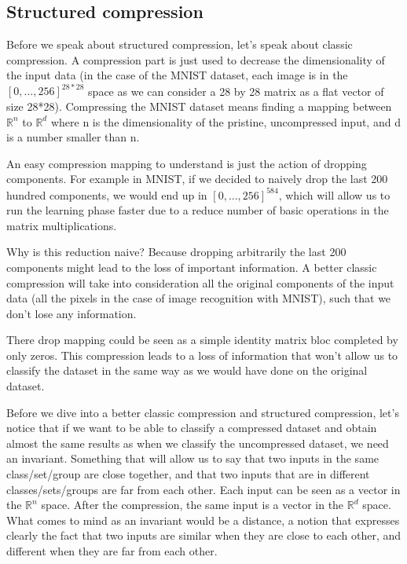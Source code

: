\documentclass[11pt,a4paper]{article}
\begin{document}
	\subsection{Structured compression}
	Before we speak about structured compression, let's speak about classic compression. A compression part is just used to decrease the dimensionality of the input data (in the case of the MNIST dataset, each image is in the $[0, \dots, 256]^{28*28}$ space as we can consider a 28 by 28 matrix as a flat vector of size 28*28). Compressing the MNIST dataset means finding a mapping between $\mathbb{R}^n$ to $\mathbb{R}^d$ where n is the dimensionality of the pristine, uncompressed input, and d is a number smaller than n.
	
	
	An easy compression mapping to understand is just the action of dropping components. For example in MNIST, if we decided to naively drop the last 200 hundred components, we would end up in $[0,\dots, 256]^{584}$, which will allow us to run the learning phase faster due to a reduce number of basic operations in the matrix multiplications.
	
	
	Why is this reduction naive? Because dropping arbitrarily the last 200 components might lead to the loss of important information. A better classic compression will take into consideration all the original components of the input data (all the pixels in the case of image recognition with MNIST), such that we don't lose any information.
	
	
	There drop mapping could be seen as a simple identity matrix bloc completed by only zeros. This compression leads to a loss of information that won't allow us to classify the dataset in the same way as we would have done on the original dataset.
	
	Before we dive into a better classic compression and structured compression, let's notice that if we want to be able to classify a compressed dataset and obtain almost the same results as when we classify the uncompressed dataset, we need an invariant. Something that will allow us to say that two inputs in the same class/set/group are close together, and that two inputs that are in different classes/sets/groups are far from each other. Each input can be seen as a vector in the $\mathbb{R}^n$ space. After the compression, the same input is a vector in the $\mathbb{R}^d$ space. What comes to mind as an invariant would be a distance, a notion that expresses clearly the fact that two inputs are similar when they are close to each other, and different when they are far from each other.
	
\end{document}
